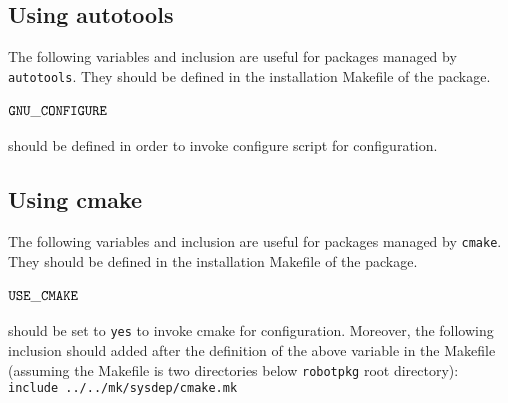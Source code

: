 %
%
%
%
%

\subsection*{Using autotools}

The following variables and inclusion are useful for packages managed by {\tt autotools}. They should be defined in the installation Makefile of the package.

\paragraph{${\tt GNU\_CONFIGURE}$} should be defined in order to invoke configure script for configuration. 

\subsection*{Using cmake}

The following variables and inclusion are useful for packages managed by {\tt cmake}. They should be defined in the installation Makefile of the package.

\paragraph{${\tt USE\_CMAKE}$} should be set to {\tt yes} to invoke cmake for configuration. Moreover, the following inclusion should added after the definition of the above variable in the Makefile (assuming the Makefile is two directories below {\tt robotpkg} root directory):\\
{\tt include ../../mk/sysdep/cmake.mk}

